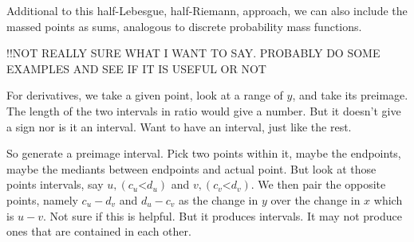 \documentclass[12pt]{article}
\theoremstyle{remark}
\newcommand{\lt}{\mathord{<}}
\begin{document}
Additional to this half-Lebesgue, half-Riemann, approach, we can also include the massed points as sums, analogous to discrete probability mass functions. 

!!NOT REALLY SURE WHAT I WANT TO SAY. PROBABLY DO SOME EXAMPLES AND SEE IF IT IS USEFUL OR NOT

For derivatives, we take a given point, look at a range of $y$, and take its preimage. The length of the two intervals in ratio would give a number. But it doesn't give a sign nor is it an interval. Want to have an interval, just like the rest. 

So generate a preimage interval. Pick two points within it, maybe the endpoints, maybe the mediants between endpoints and actual point. But look at those points intervals, say $u, (c_u\lt d_u)$ and $v, (c_v\lt d_v)$. We then pair the opposite points, namely $c_u - d_v$ and $d_u - c_v$ as the change in $y$ over the change in $x$ which is $u-v$. Not sure if this is helpful.  But it produces intervals. It may not produce ones that are contained in each other. 


\medskip

\printbibliography
\end{document}
